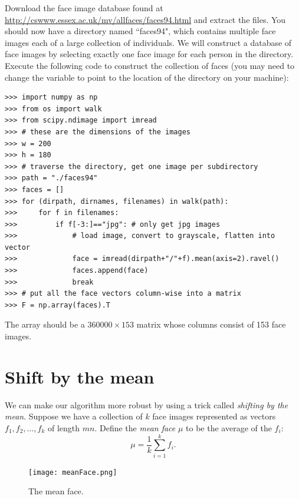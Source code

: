 \begin{problem}
\label{prob:getTrainingFaces}
Download the  face image database found at \url{http://cswww.essex.ac.uk/mv/allfaces/faces94.html} and extract the files.
You should now have a directory named ``faces94", which contains multiple face images each of a large collection of individuals.
We will construct a database of face images by selecting exactly one face image for each person in the directory.
Execute the following code to construct the collection of faces (you may need to change the variable  to point to the location
of the  directory on your machine):
\begin{lstlisting}
>>> import numpy as np
>>> from os import walk
>>> from scipy.ndimage import imread
>>> # these are the dimensions of the images
>>> w = 200
>>> h = 180
>>> # traverse the directory, get one image per subdirectory
>>> path = "./faces94"
>>> faces = []
>>> for (dirpath, dirnames, filenames) in walk(path):
>>>     for f in filenames:
>>>         if f[-3:]=="jpg": # only get jpg images
>>>             # load image, convert to grayscale, flatten into vector
>>>             face = imread(dirpath+"/"+f).mean(axis=2).ravel()
>>>             faces.append(face)
>>>             break
>>> # put all the face vectors column-wise into a matrix
>>> F = np.array(faces).T
\end{lstlisting}
The array  should be a $360000 \times 153$ matrix whose columns consist of 153 face images.
\end{problem}


\section*{Shift by the mean}

We can make our algorithm more robust by using a trick called \emph{shifting by the mean}. 
Suppose we have a collection of $k$ face images represented as vectors $f_1, f_2, \ldots, f_k$ of length $mn$.
Define the \emph{mean face} $\mu$ to be the average of the $f_i$:
\[
\mu = \frac{1}{k}\sum_{i=1}^k f_i.
\]
\begin{figure}
\texttt{[image: meanFace.png]}
\caption{The mean face.}
\label{facialRecognition:meanFace}
\end{figure}

